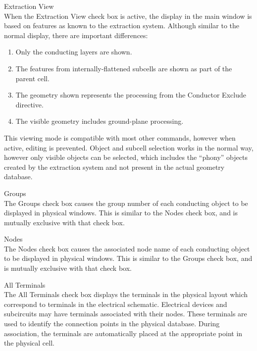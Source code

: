 \begin{description}
\item{\cb Extraction View}\\
When the {\cb Extraction View} check box is active, the display in the
main window is based on features as known to the extraction system. 
Although similar to the normal display, there are important
differences:

\begin{enumerate}
\item{Only the conducting layers are shown.}
\item{The features from internally-flattened subcells are shown as part
of the parent cell.}
\item{The geometry shown represents the processing from the
{\vt Conductor Exclude} directive.}
\item{The visible geometry includes ground-plane processing.}
\end{enumerate}

This viewing mode is compatible with most other commands, however when
active, editing is prevented.  Object and subcell selection works in
the normal way, however only visible objects can be selected, which
includes the ``phony'' objects created by the extraction system and
not present in the actual geometry database.

\item{\cb Groups}\\
The {\cb Groups} check box causes the group number of each conducting
object to be displayed in physical windows.  This is similar to the
{\cb Nodes} check box, and is mutually exclusive with that check box.

\item{\cb Nodes}\\
The {\cb Nodes} check box causes the associated node name of each
conducting object to be displayed in physical windows.  This is
similar to the {\cb Groups} check box, and is mutually exclusive with
that check box.

\item{\cb All Terminals}\\
The {\cb All Terminals} check box displays the terminals in the
physical layout which correspond to terminals in the electrical
schematic.  Electrical devices and subcircuits may have terminals
associated with their nodes.  These terminals are used to identify the
connection points in the physical database.  During association, the
terminals are automatically placed at the appropriate point in the
physical cell.


\end{description}
